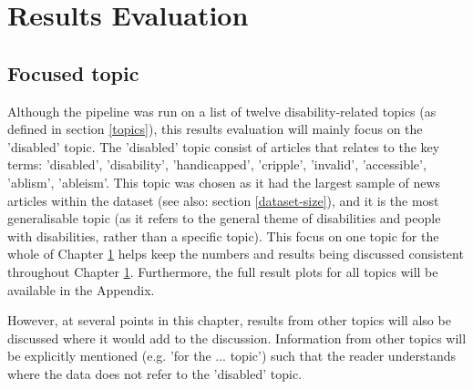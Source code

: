 \documentclass{report}
\begin{document}



\chapter{Results Evaluation} \label{Results Evaluation}  %

\section{Focused topic} \label{Focused topic}
Although the pipeline was run on a list of twelve disability-related topics (as defined in section \ref{topics}), this results evaluation will mainly focus on the 'disabled' topic.
The 'disabled' topic consist of articles that relates to the key terms: 'disabled', 'disability', 'handicapped', 'cripple', 'invalid', 'accessible', 'ablism', 'ableism'.
This topic was chosen as it had the largest sample of news articles within the dataset (see also: section \ref{dataset-size}), and it is the most generalisable topic (as it refers to the general theme of disabilities and people with disabilities, rather than a specific topic).
This focus on one topic for the whole of Chapter \ref{Results Evaluation} helps keep the numbers and results being discussed consistent throughout Chapter \ref{Results Evaluation}.
Furthermore, the full result plots for all topics will be available in the Appendix.

However, at several points in this chapter, results from other topics will also be discussed where it would add to the discussion.
Information from other topics will be explicitly mentioned (e.g. 'for the ... topic') such that the reader understands where the data does not refer to the 'disabled' topic.
\end{document}

